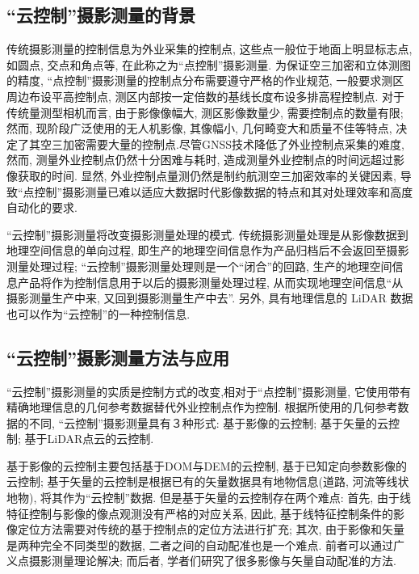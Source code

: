 \documentclass[12pt, a4paper, UTF8]{article}
\begin{document}
\subsection{``云控制''摄影测量的背景}
传统摄影测量的控制信息为外业采集的控制点, 这些点一般位于地面上明显标志点, 如圆点, 交点和角点等, 在此称之为``点控制''摄影测量. 为保证空三加密和立体测图的精度, ``点控制''摄影测量的控制点分布需要遵守严格的作业规范, 一般要求测区周边布设平高控制点, 测区内部按一定倍数的基线长度布设多排高程控制点. 对于传统量测型相机而言, 由于影像像幅大, 测区影像数量少, 需要控制点的数量有限; 然而, 现阶段广泛使用的无人机影像, 其像幅小, 几何畸变大和质量不佳等特点, 决定了其空三加密需要大量的控制点.尽管GNSS技术降低了外业控制点采集的难度, 然而, 测量外业控制点仍然十分困难与耗时, 造成测量外业控制点的时间远超过影像获取的时间. 显然, 外业控制点量测仍然是制约航测空三加密效率的关键因素, 导致``点控制''摄影测量已难以适应大数据时代影像数据的特点和其对处理效率和高度自动化的要求. 

``云控制''摄影测量将改变摄影测量处理的模式. 传统摄影测量处理是从影像数据到地理空间信息的单向过程, 即生产的地理空间信息作为产品归档后不会返回至摄影测量处理过程; ``云控制''摄影测量处理则是一个``闭合''的回路, 生产的地理空间信息产品将作为控制信息用于以后的摄影测量处理过程, 从而实现地理空间信息``从摄影测量生产中来, 又回到摄影测量生产中去''. 另外, 具有地理信息的 LiDAR 数据也可以作为``云控制''的一种控制信息.

\subsection{``云控制''摄影测量方法与应用}
``云控制''摄影测量的实质是控制方式的改变,相对于``点控制''摄影测量, 它使用带有精确地理信息的几何参考数据替代外业控制点作为控制. 根据所使用的几何参考数据的不同, ``云控制''摄影测量具有３种形式: 基于影像的云控制; 基于矢量的云控制; 基于LiDAR点云的云控制.

基于影像的云控制主要包括基于DOM与DEM的云控制, 基于已知定向参数影像的云控制; 基于矢量的云控制是根据已有的矢量数据具有地物信息(道路, 河流等线状地物), 将其作为``云控制''数据. 但是基于矢量的云控制存在两个难点: 首先, 由于线特征控制与影像的像点观测没有严格的对应关系, 因此, 基于线特征控制条件的影像定位方法需要对传统的基于控制点的定位方法进行扩充; 其次, 由于影像和矢量是两种完全不同类型的数据, 二者之间的自动配准也是一个难点. 前者可以通过广义点摄影测量理论解决; 而后者, 学者们研究了很多影像与矢量自动配准的方法. 
\end{document}
